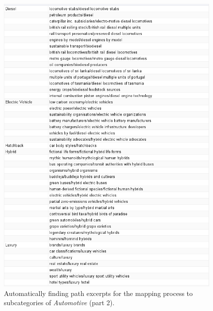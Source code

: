 \begin{figure}[h]
\centering
\includegraphics[width=\textwidth]{Chapters/Results/Automatic_classification_2}
\caption[Automatic mapping between categories and path excerpts, part 2]{Automatically finding path excerpts for the mapping process to subcategories of \emph{Automotive} (part 2).}
\label{fig:autoclassification2}
\end{figure}



